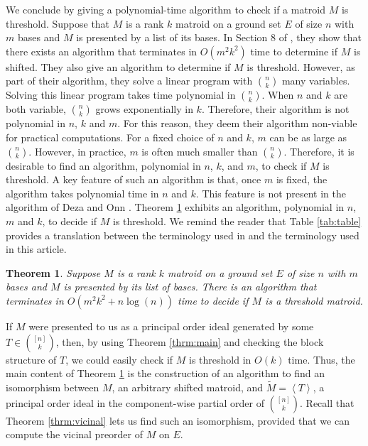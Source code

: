 \documentclass{amsart}
\theoremstyle{definition}
\theoremstyle{plain}
\newtheorem{thrm}[defn]{Theorem}
\begin{document}
We conclude by giving a polynomial-time algorithm to check if a matroid $M$ is threshold. Suppose that $M$ is a rank $k$ matroid on a ground set $E$ of size $n$ with $m$ bases and $M$ is presented by a list of its bases. In Section $8$ of \cite{DO}, they show that there exists an algorithm that terminates in $O(m^{2}k^{2})$ time to determine if $M$ is shifted. They also give an algorithm to determine if $M$ is threshold. However, as part of their algorithm, they solve a linear program with $\binom{n}{k}$ many variables. Solving this linear program takes time polynomial in $\binom{n}{k}$. When $n$ and $k$ are both variable, $\binom{n}{k}$ grows exponentially in $k$. Therefore, their algorithm is not polynomial in $n$, $k$ and $m$. For this reason, they deem their algorithm non-viable for practical computations. For a fixed choice of $n$ and $k$, $m$ can be as large as $\binom{n}{k}$. However, in practice, $m$ is often much smaller than $\binom{n}{k}$. Therefore, it is desirable to find an algorithm, polynomial in $n$, $k$, and $m$, to check if $M$ is threshold. A key feature of such an algorithm is that, once $m$ is fixed, the algorithm takes polynomial time in $n$ and $k$. This feature is not present in the algorithm of Deza and Onn \cite[Section $8$]{DO}. Theorem \ref{thrm:polynomial} exhibits an algorithm, polynomial in $n$, $m$ and $k$, to decide if $M$ is threshold. We remind the reader that Table \ref{tab:table} provides a translation between the terminology used in \cite{DO} and the terminology used in this article. 

\begin{thrm}
\label{thrm:polynomial}
Suppose $M$ is a rank $k$ matroid on a ground set $E$ of size $n$ with $m$ bases and $M$ is presented by its list of bases. There is an algorithm that terminates in $O(m^{2}k^{2}+n\log(n))$ time to decide if $M$ is a threshold matroid.
\end{thrm}

If $M$ were presented to us as a principal order ideal generated by some $T\in \binom{[n]}{k}$, then, by using Theorem \ref{thrm:main} and checking the block structure of $T$, we could easily check if $M$ is threshold in $O(k)$ time. Thus, the main content of Theorem \ref{thrm:polynomial} is the construction of an algorithm to find an isomorphism between $M$, an arbitrary shifted matroid, and $\tilde M = \left\langle T \right\rangle$, a principal order ideal in the component-wise partial order of $\binom{[n]}{k}$. Recall that Theorem \ref{thrm:vicinal} lets us find such an isomorphism, provided that we can compute the vicinal preorder of $M$ on $E$.
\end{document}

